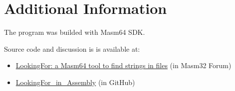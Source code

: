 \documentclass[11pt,a4paper]{scrartcl}
\begin{document}
\section{Additional Information}

	The program was builded with Masm64 SDK.
	
	Source code and discussion is is available at:
    \begin{itemize}
	
	\item \href{https://masm32.com/board/index.php?topic=11888.0}{LookingFor: a Masm64 tool to find strings in files} (in Masm32 Forum) 
	\item \href{https://github.com/ASMHSE/LookingFor-in-Assembly}{LookingFor\_in\_Assembly} (in GitHub) 
     \end{itemize}
	
\end{document}
